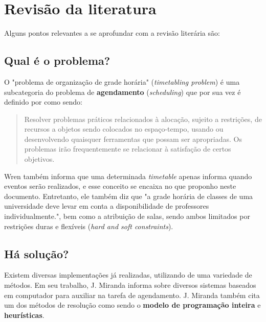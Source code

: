 \chapter{Revisão da literatura}
    
    Alguns pontos relevantes a se aprofundar com a revisão literária são:
    
    \section{Qual é o problema?}
        
        O "problema de organização de grade horária" (\textit{timetabling problem}) é uma subcategoria do problema de \textbf{agendamento} (\textit{scheduling}) que por sua vez é definido por \cite{WREN1996} como sendo:

        \begin{quote}\footnotesize
            Resolver problemas práticos relacionados à alocação, sujeito a restrições, de recursos a objetos sendo colocados no espaço-tempo, usando ou desenvolvendo quaisquer ferramentas que possam ser apropriadas. Os problemas irão frequentemente se relacionar à satisfação de certos objetivos.
        \end{quote}
        
        Wren também informa que uma determinada \textit{timetable} apenas informa quando eventos serão realizados, e esse conceito se encaixa no que proponho neste documento. Entretanto, ele também diz que "a grade horária de classes de uma universidade deve levar em conta a disponibilidade de professores individualmente.", bem como a atribuição de salas, sendo ambos limitados por restrições duras e flexíveis (\textit{hard and soft constraints}).
    
    \section{Há solução?}
        
        Existem diversas implementações já realizadas, utilizando de uma variedade de métodos. Em seu trabalho, J. Miranda \cite{MIRANDA2012505} informa sobre diversos sistemas baseados em computador para auxiliar na tarefa de agendamento. J. Miranda também cita um dos métodos de resolução como sendo o \textbf{modelo de programação inteira} e \textbf{heurísticas}.
        

